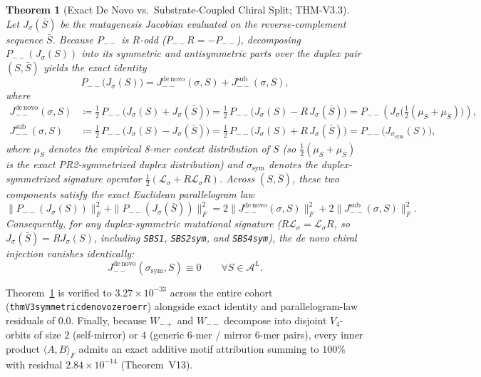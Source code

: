\documentclass[11pt, a4paper]{article}
\newtheorem{theorem}{Theorem}[section]
\DeclareRobustCommand{\_}{\textunderscore\allowbreak}
\begin{document}
\begin{theorem}[Exact De Novo vs.\ Substrate-Coupled Chiral Split; THM-V3.3]
\label{thm:denovo_split}
Let $J_\sigma(\bar{S})$ be the mutagenesis Jacobian evaluated on the reverse-complement sequence $\bar{S}$. Because $P_{--}$ is $R$-odd ($P_{--} R = -P_{--}$), decomposing $P_{--}(J_\sigma(S))$ into its symmetric and antisymmetric parts over the duplex pair $(S, \bar{S})$ yields the exact identity
\begin{equation}
    P_{--}\bigl(J_\sigma(S)\bigr) = J_{--}^{\mathrm{de\,novo}}(\sigma, S) + J_{--}^{\mathrm{sub}}(\sigma, S),
\end{equation}
where
\begin{align}
    J_{--}^{\mathrm{de\,novo}}(\sigma, S) &\coloneqq \frac{1}{2}\,P_{--}\!\bigl(J_\sigma(S) + J_\sigma(\bar{S})\bigr) = \frac{1}{2}\,P_{--}\!\bigl(J_\sigma(S) - R\,J_\sigma(\bar{S})\bigr) = P_{--}\!\left(J_\sigma\!\bigl(\tfrac{1}{2}(\mu_S + \mu_{\bar{S}})\bigr)\right), \\
    J_{--}^{\mathrm{sub}}(\sigma, S) &\coloneqq \frac{1}{2}\,P_{--}\!\bigl(J_\sigma(S) - J_\sigma(\bar{S})\bigr) = \frac{1}{2}\,P_{--}\!\bigl(J_\sigma(S) + R\,J_\sigma(\bar{S})\bigr) = P_{--}\!\bigl(J_{\sigma_{\mathrm{sym}}}(S)\bigr),
\end{align}
where $\mu_S$ denotes the empirical 8-mer context distribution of $S$ (so $\frac{1}{2}(\mu_S + \mu_{\bar{S}})$ is the exact PR2-symmetrized duplex distribution) and $\sigma_{\mathrm{sym}}$ denotes the duplex-symmetrized signature operator $\frac{1}{2}(\mathcal{L}_\sigma + R\mathcal{L}_\sigma R)$. Across $(S, \bar{S})$, these two components satisfy the exact Euclidean parallelogram law
\begin{equation}
    \|P_{--}(J_\sigma(S))\|_F^2 + \|P_{--}(J_\sigma(\bar{S}))\|_F^2 = 2\|J_{--}^{\mathrm{de\,novo}}(\sigma, S)\|_F^2 + 2\|J_{--}^{\mathrm{sub}}(\sigma, S)\|_F^2.
\end{equation}
Consequently, for \emph{any} duplex-symmetric mutational signature ($R \mathcal{L}_\sigma = \mathcal{L}_\sigma R$, so $J_\sigma(\bar{S}) = R J_\sigma(S)$, including \texttt{SBS1}, \texttt{SBS2\_sym}, and \texttt{SBS4\_sym}), the \textit{de novo} chiral injection vanishes identically:
\begin{equation}
    J_{--}^{\mathrm{de\,novo}}(\sigma_{\mathrm{sym}}, S) \equiv 0 \qquad \forall S \in \mathcal{A}^L.
\end{equation}
\end{theorem}

Theorem~\ref{thm:denovo_split} is verified to $3.27 \times 10^{-33}$ across the entire cohort (\texttt{thmV3\_3\_symmetric\_denovo\_zero\_err}) alongside exact identity and parallelogram-law residuals of $0.0$. Finally, because $W_{-+}$ and $W_{--}$ decompose into disjoint $V_4$-orbits of size $2$ (self-mirror) or $4$ (generic 6-mer / mirror 6-mer pairs), every inner product $\langle A, B \rangle_F$ admits an exact additive motif attribution summing to $100\%$ with residual $2.84 \times 10^{-14}$ (Theorem~V13).
\end{document}
